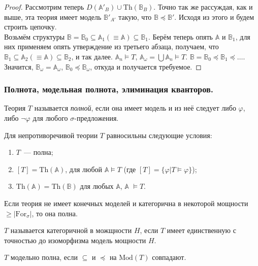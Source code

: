 \begin{proof}
    Рассмотрим теперь $D(\mathbb{A}'_B) \cup \text{Th}(\mathbb{B}_B)$. Точно так же рассуждая, как и выше, эта теория имеет модель $\mathbb{B}'_{A'}$ такую, что $\mathbb{B} \preceq \mathbb{B}'$. Исходя из этого и будем строить цепочку. \\ 

    Возьмём структуры $\mathbb{B} = \mathbb{B}_0 \subseteq \mathbb{A}_1 (\equiv \mathbb{A}) \subseteq \mathbb{B}_1$. Берём теперь опять $\mathbb{A}$ и $\mathbb{B}_1$, для них применяем опять утверждение из третьего абзаца, получаем, что $\mathbb{B}_1 \subseteq \mathbb{A}_2 (\equiv \mathbb{A}) \subseteq \mathbb{B}_2$, и так далее. $\mathbb{A}_n \models T$, $\mathbb{A}_\omega = \bigcup \mathbb{A}_n \models T$. $\mathbb{B} = \mathbb{B}_0 \preceq \mathbb{B}_1 \preceq \ldots$. Значится, $\mathbb{B}_\omega = \mathbb{A}_\omega$, $\mathbb{B}_0 \preceq \mathbb{B}_\omega$, откуда и получается требуемое.
\end{proof}

\subsubsection{Полнота, модельная полнота, элиминация кванторов.} 

\begin{definition}
    Теория $T$ называется \textit{полной}, если она имеет модель и из неё следует либо $\varphi$, либо $\neg \varphi$ для любого $\sigma$-предложения.
\end{definition}

\begin{stat}
    Для непротиворечивой теории $T$ равносильны следующие условия: 

    \begin{enumerate}
        \item $T$~— полна; 
        \item $[T] = \text{Th} (\mathbb{A})$, для любой $\mathbb{A} \models T$ (где $[T] = \{\varphi | T \models \varphi\}$); 
        \item $\text{Th}(\mathbb{A}) = \text{Th}(\mathbb{B})$ для любых $\mathbb{A}$, $\mathbb{A}$ $\models T$.
    \end{enumerate}
\end{stat}

\begin{theorem}
    Если теория не имеет конечных моделей и категорична в некоторой мощности $\geq |\text{For}_\sigma|$, то она полна.
\end{theorem}

\begin{definition}
    $T$ называется категоричной в можщности $H$, если $T$ имеет единственную с точностью до изоморфизма модель мощности $H$.
\end{definition}

\begin{definition}
    $T$ модельно полна, если $\subseteq$ и $\preceq$ на $\text{Mod}(T)$ совпадают.
\end{definition}
